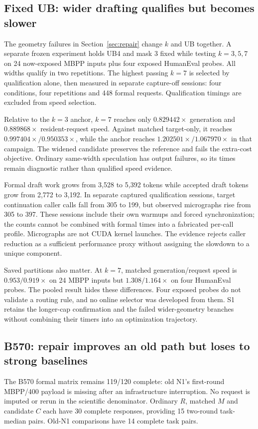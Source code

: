 \subsection{Fixed UB: wider drafting qualifies but becomes slower}
The geometry failures in Section~\ref{sec:repair} change $k$ and UB together. A separate frozen experiment holds UB4 and mask 3 fixed while testing $k=3,5,7$ on 24 now-exposed MBPP inputs plus four exposed HumanEval probes. All widths qualify in two repetitions. The highest passing $k=7$ is selected by qualification alone, then measured in separate capture-off sessions: four conditions, four repetitions and 448 formal requests. Qualification timings are excluded from speed selection.

Relative to the $k=3$ anchor, $k=7$ reaches only $0.829442\times$ generation and $0.889868\times$ resident-request speed. Against matched target-only, it reaches $0.997404\times/0.950353\times$, while the anchor reaches $1.202501\times/1.067970\times$ in that campaign. The widened candidate preserves the reference and fails the extra-cost objective. Ordinary same-width speculation has output failures, so its times remain diagnostic rather than qualified speed evidence.

Formal draft work grows from 3,528 to 5,392 tokens while accepted draft tokens grow from 2,772 to 3,192. In separate captured qualification sessions, target continuation caller calls fall from 305 to 199, but observed micrographs rise from 305 to 397. These sessions include their own warmups and forced synchronization; the counts cannot be combined with formal times into a fabricated per-call profile. Micrographs are not CUDA kernel launches. The evidence rejects caller reduction as a sufficient performance proxy without assigning the slowdown to a unique component.

Saved partitions also matter. At $k=7$, matched generation/request speed is $0.953/0.919\times$ on 24 MBPP inputs but $1.308/1.164\times$ on four HumanEval probes. The pooled result hides these differences. Four exposed probes do not validate a routing rule, and no online selector was developed from them. S1 retains the longer-cap confirmation and the failed wider-geometry branches without combining their timers into an optimization trajectory.

\subsection{B570: repair improves an old path but loses to strong baselines}
The B570 formal matrix remains 119/120 complete: old N1's first-round MBPP/400 payload is missing after an infrastructure interruption. No request is imputed or rerun in the scientific denominator. Ordinary $R$, matched $M$ and candidate $C$ each have 30 complete responses, providing 15 two-round task-median pairs. Old-N1 comparisons have 14 complete task pairs.

